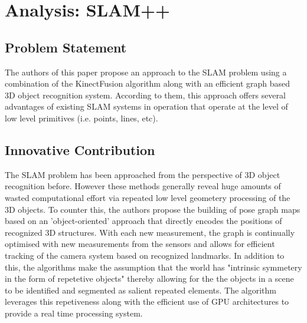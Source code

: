 \documentclass[10pt,twocolumn,letterpaper]{article}
\begin{document}



\section {Analysis: SLAM++}

\subsection{Problem Statement}

The authors of this paper propose an approach to the SLAM problem using a combination of the KinectFusion algorithm along with an efficient graph based 3D object recognition system. According to them, this approach offers several advantages of existing SLAM systems in operation that operate at the level of low level primitives (i.e. points, lines, etc). 

\subsection{Innovative Contribution}

The SLAM problem has been approached from the perspective of 3D object recognition before. However these methods generally reveal  huge amounts of wasted computational effort via repeated low level geometery processing of the 3D objects. To counter this, the authors propose the building of pose graph maps based on an 'object-oriented' approach that directly encodes the positions of recognized 3D structures. With each new measurement, the graph is continually optimised with new measurements from the sensors and allows for efficient tracking of the camera system based on recognized landmarks. In addition to this, the algorithms make the assumption that the world has "intrinsic symmetery in the form of repetetive objects" thereby allowing for the the objects in a scene to be identified and segmented as salient repeated elements. The algorithm leverages this repetiveness along with the efficient use of GPU architectures to provide a real time processing system. 
\end{document}
